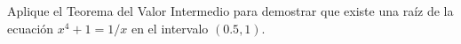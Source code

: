 \item Aplique el Teorema del Valor Intermedio para demostrar que existe una raíz de la ecuación $x^4 + 1 = 1/x$ en el intervalo $(0.5, 1)$.
